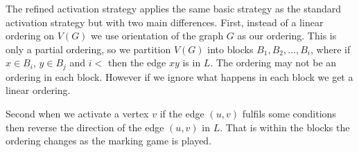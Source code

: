 The refined activation strategy applies the same basic strategy as the standard activation strategy but with two main differences. First, instead of a linear ordering on $V(G)$ we use orientation of the graph $G$ as our ordering. This is only a partial ordering, so we partition $V(G)$ into blocks $B_1,B_2,\dots,B_i$, where if $x \in B_i$, $y \in B_j$ and $i <$ then the edge $xy$ is in $L$. The ordering may not be an ordering in each block. However if we ignore what happens in each block we get a linear ordering.

Second when we activate a vertex $v$ if the edge $(u,v)$ fulfils some conditions then reverse the direction of the edge $(u,v)$ in $L$. That is within the blocks the ordering changes as the marking game is played.

%
%
%
%


















